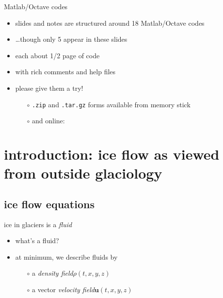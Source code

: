 \begin{frame}{Matlab/Octave codes}

\begin{itemize}
\item slides and notes are structured around 18 Matlab/Octave codes
\item \dots though only 5 appear in these slides
\item each about 1/2 page of code
\item with rich comments and help files
\item please give them a try!

  \begin{itemize}
  \item[$\circ$] \texttt{.zip} and \texttt{.tar.gz} forms available from memory stick
  \item[$\circ$] and online:

  \bigskip\bigskip\small
  \centerline{}
  
  \end{itemize}
\end{itemize}
\end{frame}


\section[introduction]{introduction: ice flow as viewed from outside glaciology}

\subsection{ice flow equations}

\begin{frame}{ice in glaciers is a \emph{fluid}}

\begin{itemize}
\item<1-> what's a fluid?

\bigskip\bigskip
\item<2> at minimum, we describe fluids by
  \begin{itemize}
  \item[$\circ$] a \emph{density field}\quad $\rho(t,x,y,z)$
  \item[$\circ$] a vector \emph{velocity field}\quad $\mathbf{u}(t,x,y,z)$
  \end{itemize}
\end{itemize}
\end{frame}


